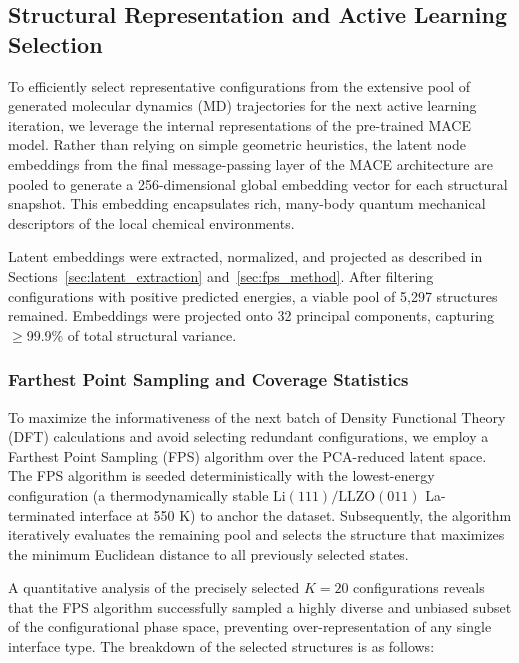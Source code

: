 \documentclass[12pt,a4paper,oneside]{book}
\begin{document}
\subsection{Structural Representation and Active Learning Selection}
\label{sec:fps_selection}

To efficiently select representative configurations from the extensive pool of generated molecular dynamics (MD) trajectories for the next active learning iteration, we leverage the internal representations of the pre-trained MACE model. Rather than relying on simple geometric heuristics, the latent node embeddings from the final message-passing layer of the MACE architecture are pooled to generate a 256-dimensional global embedding vector for each structural snapshot. This embedding encapsulates rich, many-body quantum mechanical descriptors of the local chemical environments.

Latent embeddings were extracted, normalized, and projected as described in 
Sections~\ref{sec:latent_extraction} and~\ref{sec:fps_method}. After filtering 
configurations with positive predicted energies, a viable pool of 5{,}297 
structures remained. Embeddings were projected onto 32 principal components, 
capturing $\geq$99.9\% of total structural variance.

\subsubsection{Farthest Point Sampling and Coverage Statistics}
To maximize the informativeness of the next batch of Density Functional Theory (DFT) calculations and avoid selecting redundant configurations, we employ a Farthest Point Sampling (FPS) algorithm over the PCA-reduced latent space. The FPS algorithm is seeded deterministically with the lowest-energy configuration (a thermodynamically stable $\text{Li}(111)/\text{LLZO}(011)$ La-terminated interface at 550 K) to anchor the dataset. Subsequently, the algorithm iteratively evaluates the remaining pool and selects the structure that maximizes the minimum Euclidean distance to all previously selected states.

A quantitative analysis of the precisely selected $K=20$ configurations reveals that the FPS algorithm successfully sampled a highly diverse and unbiased subset of the configurational phase space, preventing over-representation of any single interface type. The breakdown of the selected structures is as follows:
\end{document}
